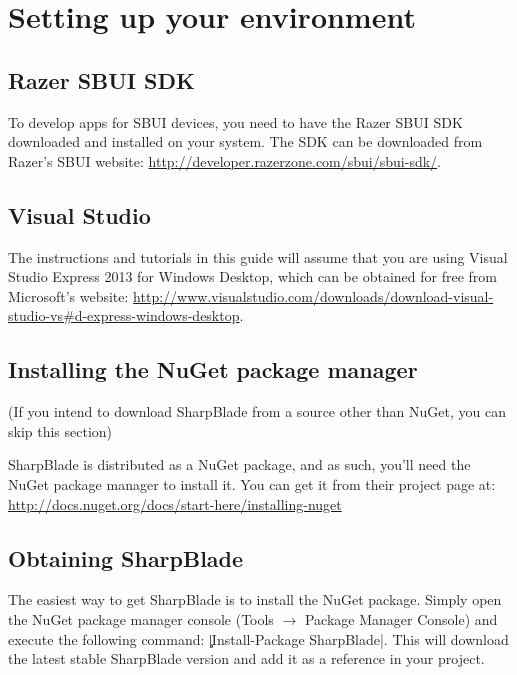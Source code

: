 \chapter{Setting up your environment}
\section{Razer SBUI SDK}
To develop apps for SBUI devices, you need to have the Razer SBUI SDK downloaded and installed on your system. The SDK can be downloaded from Razer's SBUI website: \url{http://developer.razerzone.com/sbui/sbui-sdk/}.

\section{Visual Studio}
The instructions and tutorials in this guide will assume that you are using Visual Studio Express 2013 for Windows Desktop, which can be obtained for free from Microsoft's website: \url{http://www.visualstudio.com/downloads/download-visual-studio-vs#d-express-windows-desktop}.

\section{Installing the NuGet package manager}
(If you intend to download SharpBlade from a source other than NuGet, you can skip this section)

SharpBlade is distributed as a NuGet package, and as such, you'll need the NuGet package manager to install it. You can get it from their project page at: \url{http://docs.nuget.org/docs/start-here/installing-nuget}

\section{Obtaining SharpBlade}
The easiest way to get SharpBlade is to install the NuGet package. Simply open the NuGet package manager console (Tools $\rightarrow$ Package Manager Console) and execute the following command: \c|Install-Package SharpBlade|. This will download the latest stable SharpBlade version and add it as a reference in your project.
